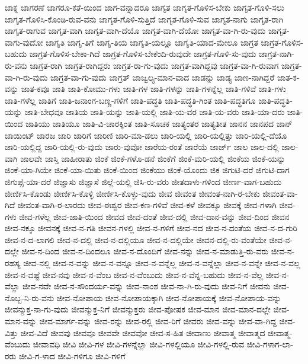 {ಜಾಕ್ನ
ಜಾಗರಣೆ
ಜಾಗರೂ-ಕತೆ-ಯಿಂದ
ಜಾಗ-ವನ್ನಾದರೂ
ಜಾಗೃತ
ಜಾಗೃತ-ಗೊಳಿಸ-ಬೇಕು
ಜಾಗೃತ-ಗೊಳಿ-ಸಲು
ಜಾಗೃತ-ಗೊಳಿಸಿ-ಕೊಂಡಿ-ರುವ-ವನು
ಜಾಗೃತ-ಗೊಳಿ-ಸುತ್ತಿದೆ
ಜಾಗೃತ-ಗೊಳಿ-ಸುವ
ಜಾಗೃತ-ನಾಗು
ಜಾಗೃತ-ರಾಗಿ
ಜಾಗೃತ-ರಾಗುವ
ಜಾಗೃತ-ವಾಗಿ
ಜಾಗೃತ-ವಾಗಿ-ದೆಯೊ
ಜಾಗೃತ-ವಾಗಿ-ದೆಯೋ
ಜಾಗೃತ-ವಾ-ಗಿ-ರು-ವುದು
ಜಾಗೃತ-ವಾಗು-ವುದೋ
ಜಾಗೃತಿ
ಜಾಗೃ-ತಿಗೆ
ಜಾಗೃ-ತಿಯ
ಜಾಗೃತಿ-ಯಲ್ಲೂ
ಜಾಗೃತಿ-ಯಾದ-ಮೇಲೂ
ಜಾಗ್ರತ
ಜಾಗ್ರತ-ಗೊಳಿಸ-ಬಹುದು
ಜಾಗ್ರತ-ಗೊಳಿಸ-ಬೇಕಾ-ಗಿದೆ
ಜಾಗ್ರತ-ಗೊಳಿಸ-ಬೇಕೆಂದಿ-ರುವುದೇ
ಜಾಗ್ರತ-ಗೊಳಿ-ಸು-ವುದು
ಜಾಗ್ರತ-ನಾಗಿ-ರು-ವನು
ಜಾಗ್ರತ-ರಾಗಿ
ಜಾಗ್ರತ-ರಾಗಿದ್ದರು
ಜಾಗ್ರತ-ರಾ-ಗು-ವುದು
ಜಾಗ್ರತ-ವಾಗಿದ್ದವು
ಜಾಗ್ರತ-ವಾ-ಗಿ-ರುವಾಗ
ಜಾಗ್ರತ-ವಾ-ಗಿ-ರು-ವುದು
ಜಾಗ್ರತ-ವಾ-ಗು-ವುದು
ಜಾಗ್ರತ್
ಜಾಜ್ವಲ್ಯ-ಮಾನ-ವಾದ
ಜಾಡನ್ನು
ಜಾಡ್ಯ
ಜಾಣ-ನಾಗಿದ್ದರೆ
ಜಾತ-ಕ-ವನ್ನು
ಜಾತ-ಕವೂ
ಜಾತಿ
ಜಾತಿ-ಕೋಮು-ಗಳು
ಜಾತಿ-ಗಳ
ಜಾತಿ-ಗಳನ್ನು
ಜಾತಿ-ಗಳನ್ನೆಲ್ಲ
ಜಾತಿ-ಗಳಿವೆ
ಜಾತಿ-ಗಳು
ಜಾತಿ-ಗಳೆಲ್ಲ
ಜಾತಿಗೆ
ಜಾತಿ-ಜನಾಂಗ-ಬಣ್ಣ-ಗಳಿಗೆ
ಜಾತಿ-ಪದ್ಧತಿ
ಜಾತಿ-ಪದ್ಧತಿ-ಗಿಂತ
ಜಾತಿ-ಪದ್ಧತಿಗೂ
ಜಾತಿ-ಪದ್ಧತಿ-ಯನ್ನು
ಜಾತಿ-ಬೇಧವೂ
ಜಾತಿಯ
ಜಾತಿ-ಯನ್ನು
ಜಾತಿ-ಯಲ್ಲಿ
ಜಾತಿ-ಯ-ವರ
ಜಾತಿ-ಯ-ವರು
ಜಾತಿ-ಯಾ-ದರು
ಜಾತಿ-ಯಿಂದ
ಜಾತಿಯು
ಜಾತಿಯೂ
ಜಾತಿ-ವಿ-ಚಾರಕ್ಕಿಂತ
ಜಾತಿ-ಸೂಚಕ
ಜಾತ್ಯಂತರ
ಜಾತ್ಯತೀತ
ಜಾನನ
ಜಾನಪದ
ಜಾನ್
ಜಾಯಿಂಟ್
ಜಾರಜ
ಜಾರಿ
ಜಾರಿಗೆ
ಜಾರಿಣಿ
ಜಾರಿ-ಮಾ-ಡಲು
ಜಾರಿ-ಯಲ್ಲಿ
ಜಾರಿ-ಯಲ್ಲಿತ್ತು
ಜಾರಿ-ಯಲ್ಲಿ-ದೆಯೊ
ಜಾರಿ-ಯಲ್ಲಿದ್ದ
ಜಾರಿ-ಯಲ್ಲಿ-ರು-ವುದು
ಜಾರು-ವುವೋ
ಜಾರೆಯ-ರಂತೆ
ಜಾರೆಯೆ
ಜಾರ್ಜ್
ಜಾಲ
ಜಾಲ-ದಲ್ಲಿ
ಜಾಲ-ವಾಗಿ
ಜಾಲವೇ
ಜಾಸ್ತಿ
ಜಾಹೀರಾತು
ಜಿಂಕೆ
ಜಿಂಕೆ-ಗಳೊ-ಡನೆ
ಜಿಂಕೆಗೆ
ಜಿಂಕೆ-ಮರಿ-ಯಲ್ಲಿ
ಜಿಂಕೆಯ
ಜಿಂಕೆ-ಯನ್ನು
ಜಿಂಕೆ-ಯಾ-ಗಿಯೇ
ಜಿಂಕೆ-ಯಾ-ಯಿತು
ಜಿಂಕೆ-ಯಿಂದ
ಜಿಂಕೆಯು
ಜಿಂಕೆ-ಯೊಂದು
ಜಿಕ
ಜಿಗುಟಿ-ದರೆ
ಜಿಗುಟಿ-ದಾಗ
ಜಿಗುಪ್ಸೆ-ಯಾ-ದರೆ
ಜಿಜ್ಞಾಸು
ಜಿಜ್ಞಾಸೆ
ಜಿಲ್ಲೆ-ಯಲ್ಲಿ
ಜಿಸಿ-ರು-ವರು
ಜೀತದಾಳು-ಗಳಿಂದ
ಜೀರ್ಣ-ವಾಗ-ಬಹುದು
ಜೀರ್ಣಿಸಿ-ಕೊಂಡು
ಜೀರ್ಣಿಸಿ-ಕೊಳ್ಳಿ
ಜೀರ್ಣಿಸಿ-ಕೊಳ್ಳು-ವುದು
ಜೀವ
ಜೀವಂತ
ಜೀವಂತ-ನಾಗಿ-ರ-ಬೇಕು
ಜೀವಂತ-ವಾ-ಗಿದೆ
ಜೀವಂತ-ವಾಗಿ-ರ-ಲಾರದು
ಜೀವ-ಈಶ್ವರ
ಜೀವ-ಕಣ-ಗಳಿವೆ
ಜೀವ-ಕಳೆ
ಜೀವಕ್ಕೂ
ಜೀವಕ್ಕೆ
ಜೀವ-ಗಳಾಗಿ
ಜೀವ-ಗಳು
ಜೀವ-ಗಳೆಲ್ಲ
ಜೀವ-ಜಾತಿ-ಯಿಂದ
ಜೀವದ
ಜೀವ-ದಂತೆ
ಜೀವ-ದಲ್ಲಿ
ಜೀವ-ದಾನ-ವನ್ನು
ಜೀವ-ದಿಂದ
ಜೀವನ
ಜೀವ-ನಕ್ಕೂ
ಜೀವನಕ್ಕೆ
ಜೀವ-ನ-ಗತಿ
ಜೀವನ-ಗಳಲ್ಲಿ
ಜೀವ-ನ-ಗಳಿಗೆ
ಜೀವ-ನದ
ಜೀವ-ನ-ದಂತೆಯ
ಜೀವ-ನ-ದ-ಗುರಿ
ಜೀವ-ನ-ದ-ಲಾಗಲಿ
ಜೀವ-ನ-ದಲ್ಲಿ
ಜೀವ-ನ-ದಲ್ಲಿಯೂ
ಜೀವ-ನ-ದಲ್ಲಿಯೇ
ಜೀವನ-ದಲ್ಲಿ-ರು-ವಂತೆಯೇ
ಜೀವ-ನ-ದಲ್ಲೇ
ಜೀವ-ನ-ದಿಂದ
ಜೀವ-ನ-ದಿಂದಲೂ
ಜೀವ-ನ-ದೊಂದಿಗೆ
ಜೀವ-ನನ್ನು
ಜೀವ-ನ-ಮಾಡುತ್ತಿ-ರು-ವರು
ಜೀವ-ನ-ರಹಸ್ಯ
ಜೀವ-ನಲ್ಲಿ
ಜೀವ-ನ-ವನ್ನು
ಜೀವ-ನ-ವನ್ನೂ
ಜೀವ-ನ-ವನ್ನೆಲ್ಲ
ಜೀವ-ನ-ವನ್ನೆಲ್ಲಾ
ಜೀವ-ನ-ವನ್ನೇ
ಜೀವ-ನ-ವಲ್ಲ
ಜೀವ-ನ-ವಷ್ಟೆ
ಜೀವ-ನವು
ಜೀವ-ನ-ವೆಂಬ
ಜೀವ-ನ-ವೆಂಬುದು
ಜೀವ-ನ-ವೆನ್ನ-ಬಹುದು
ಜೀವ-ನ-ವೆಲ್ಲ
ಜೀವ-ನ-ವೆಲ್ಲಾ
ಜೀವ-ನವೇ
ಜೀವ-ನ-ಸೌಂದರ್ಯ-ವನ್ನು
ಜೀವ-ನಾಂಶ
ಜೀವ-ನಾ-ಗಿ-ರು-ವುದು
ಜೀವ-ನಿಗೆ
ಜೀವನು
ಜೀವ-ನೊಬ್ಬ-ನಿ-ರು-ವನು
ಜೀವ-ನೋಪಾಯ
ಜೀವ-ನೋಪಾಯಕ್ಕಾಗಿ
ಜೀವ-ನೋಪಾಯಕ್ಕೆ
ಜೀವ-ನೋಪಾಯ-ವನ್ನು
ಜೀವನ್ಮುಕ್ತ-ನಾ-ಗು-ವುದು
ಜೀವನ್ಮುಕ್ತ-ನಿಗೆ
ಜೀವನ್ಮುಕ್ತರು
ಜೀವ-ಪೋಷಕ
ಜೀವ-ಮಾನ
ಜೀವ-ಮಾನ-ದಲ್ಲೇ
ಜೀವ-ಮಾನ-ವನ್ನು
ಜೀವ-ಮಾರ್ಗ-ವನ್ನು
ಜೀವ-ರನ್ನು
ಜೀವ-ರಲ್ಲಿ
ಜೀವ-ರಿಗೆ
ಜೀವರು
ಜೀವ-ವನ್ನು
ಜೀವ-ವಾ-ಗಿದ್ದ
ಜೀವ-ವಿತ್ತು
ಜೀವ-ವಿದೆ
ಜೀವವು
ಜೀವವೂ
ಜೀವವೇ
ಜೀವವೋ
ಜೀವ-ಸ-ಹಿತ
ಜೀವಾಣು
ಜೀವಾತ್ಮ
ಜೀವಾತ್ಮದ
ಜೀವಾತ್ಮ-ವೆಂಬುದು
ಜೀವಾವಧಿ
ಜೀವಿ
ಜೀವಿ-ಗಳ
ಜೀವಿ-ಗಳನ್ನೆಲ್ಲಾ
ಜೀವಿ-ಗಳಲ್ಲಿಯೂ
ಜೀವಿ-ಗಳಲ್ಲಿ-ರುವ
ಜೀವಿ-ಗಳಾಗ-ಲಾ-ರರು
ಜೀವಿ-ಗ-ಳಾದ
ಜೀವಿ-ಗಳಿಗೂ
ಜೀವಿ-ಗಳಿಗೆ
}
